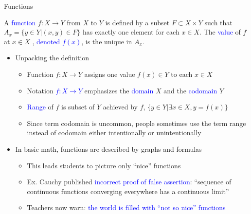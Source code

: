 \documentclass[10pt,english]{beamer}
\begin{document}
\begin{frame}{Functions}

\vspace{3mm}

\begin{definition}
A \textcolor{blue}{function} $f \colon X \rightarrow Y$ from $X$ to $Y$ is defined by a subset $F \subset X \times Y$ such that $A_x = \{ y\in Y | (x,y)\in F \}$ has exactly one element for each $x\in X$.
The \textcolor{blue}{value} of $f$ at $x\in X$ , \textcolor{blue}{denoted $f(x)$}, is the unique in $A_x$.
\end{definition}
\vspace{-4mm}

\begin{itemize}
\setlength\itemsep{3mm}
\item<1-> Unpacking the definition \vspace{1mm}
\begin{itemize} 
  \setlength\itemsep{1.5mm}
  \item Function $f \colon X\rightarrow Y$ assigns one value $f(x)\in Y$ to each $x\in X$
  \item Notation \textcolor{blue}{$f \colon X \rightarrow Y$} emphasizes the \textcolor{blue}{domain} $X$ and the \textcolor{blue}{codomain} $Y$
  \item \textcolor{blue}{Range} of $f$ is subset of $Y$ achieved by $f$, $\{y \in Y | \exists x\in X, y=f(x) \}$
  \item Since term codomain is uncommon, people sometimes use the term range instead of codomain either intentionally or unintentionally
\end{itemize}

\item<2-> In basic math, functions are described by graphs and formulas \vspace{1mm}
\begin{itemize} 
  \setlength\itemsep{1.5mm}
  \item This leads students to picture only ``nice'' functions
  \item Ex. Cauchy published \textcolor{blue}{incorrect proof of false assertion}: ``sequence of continuous functions converging everywhere has a continuous limit''
  \item Teachers now warn: \textcolor{blue}{the world is filled with ``not so nice'' functions}
\end{itemize}

\end{itemize}
\end{frame}  
\end{document}
